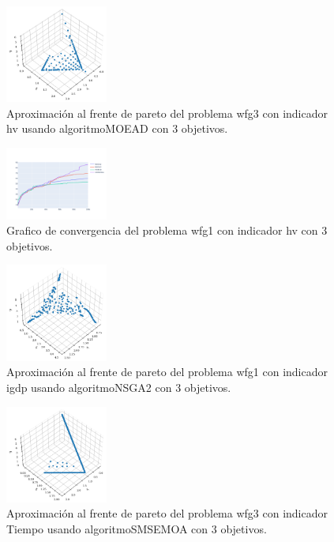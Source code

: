 \documentclass{article}
\begin{document}
\begin{figure}
	\includegraphics[width=0.3\textwidth]{MOEAD_wfg3_hv_3_fp.png}
	\caption{Aproximación al frente de pareto del problema wfg3 con indicador hv usando algoritmoMOEAD con 3 objetivos.}
\end{figure}
\clearpage
\begin{figure}
	\includegraphics[width=0.3\textwidth]{wfg1_hv_3_gc.png}
	\caption{Grafico de convergencia del problema wfg1 con indicador hv con 3 objetivos.}
\end{figure}
\begin{figure}
	\includegraphics[width=0.3\textwidth]{NSGA2_wfg1_igdp_3_fp.png}
	\caption{Aproximación al frente de pareto del problema wfg1 con indicador igdp usando algoritmoNSGA2 con 3 objetivos.}
\end{figure}
\begin{figure}
	\includegraphics[width=0.3\textwidth]{SMSEMOA_wfg3_Tiempo_3_fp.png}
	\caption{Aproximación al frente de pareto del problema wfg3 con indicador Tiempo usando algoritmoSMSEMOA con 3 objetivos.}
\end{figure}
\end{document}
